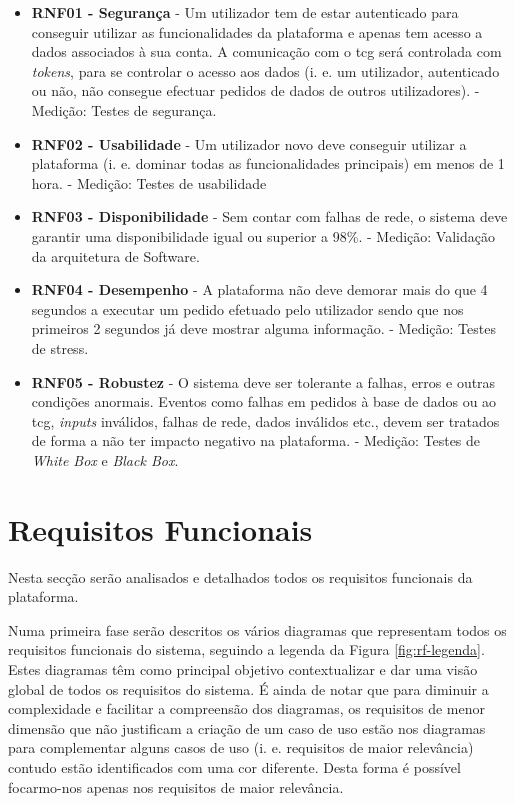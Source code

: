 \begin{itemize}
	\item \textbf{RNF01 - Segurança}
	\subitem - Um utilizador tem de estar autenticado para conseguir utilizar as funcionalidades da plataforma e apenas tem acesso a dados associados à sua conta. A comunicação com o \acrshort{tcg} será controlada com \textit{tokens}, para se controlar o acesso aos dados (i. e. um utilizador, autenticado ou não, não consegue efectuar pedidos de dados de outros utilizadores).
	\subitem - Medição: Testes de segurança.
	
	\item \textbf{RNF02 - Usabilidade} 
	\subitem - Um utilizador novo deve conseguir utilizar a plataforma (i. e. dominar todas as funcionalidades principais) em menos de 1 hora.
	\subitem - Medição: Testes de usabilidade
	
	\item \textbf{RNF03 - Disponibilidade}
	\subitem - Sem contar com falhas de rede, o sistema deve garantir uma disponibilidade  igual ou superior a 98\%.
	\subitem - Medição: Validação da arquitetura de Software.
	
	\item \textbf{RNF04 - Desempenho}
	\subitem - A plataforma não deve demorar mais do que 4 segundos a executar um pedido efetuado pelo utilizador sendo que nos primeiros 2 segundos já deve mostrar alguma informação.
	\subitem - Medição: Testes de stress.
	
	\item \textbf{RNF05 - Robustez}
	\subitem - O sistema deve ser tolerante a falhas, erros e outras condições anormais. Eventos como falhas em pedidos à base de dados ou ao \acrshort{tcg}, \textit{inputs} inválidos, falhas de rede, dados inválidos etc., devem ser tratados de forma a não ter impacto negativo na plataforma.
	\subitem - Medição: Testes de \textit{White Box} e \textit{Black Box}.
\end{itemize}


\section{Requisitos Funcionais}
\label{rf}

Nesta secção serão analisados e detalhados todos os requisitos funcionais da plataforma.

Numa primeira fase serão descritos os vários diagramas que representam todos os requisitos funcionais do sistema, seguindo a legenda da Figura \ref{fig:rf-legenda}. Estes diagramas têm como principal objetivo contextualizar e dar uma visão global de todos os requisitos do sistema. É ainda de notar que para diminuir a complexidade e facilitar a compreensão dos diagramas, os requisitos de menor dimensão que não justificam a criação de um caso de uso estão nos diagramas para complementar alguns casos de uso (i. e. requisitos de maior relevância) contudo estão identificados com uma cor diferente. Desta forma é possível focarmo-nos apenas nos requisitos de maior relevância.


